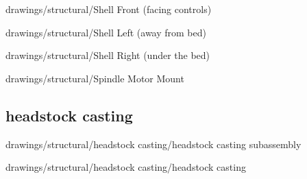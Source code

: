 
{drawings/structural/Shell Front (facing controls)}


{drawings/structural/Shell Left (away from bed)}


{drawings/structural/Shell Right (under the bed)}


{drawings/structural/Spindle Motor Mount}

\subsection{headstock casting}


{drawings/structural/headstock casting/headstock casting subassembly}


{drawings/structural/headstock casting/headstock casting}


